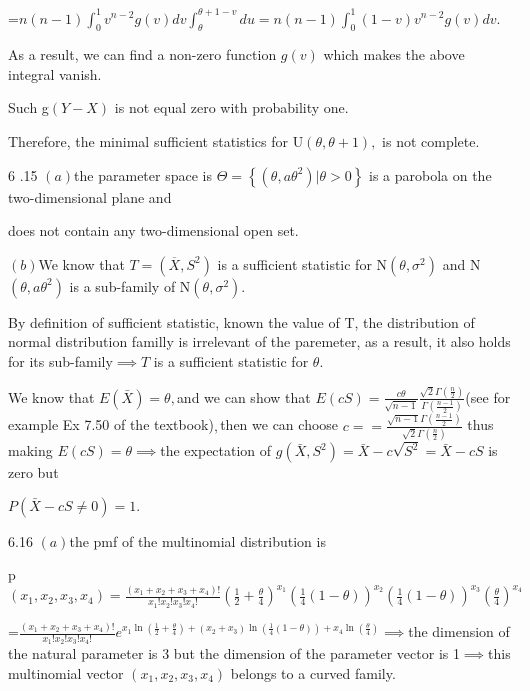 \documentclass{article}
\begin{document}
=$n\left( n-1\right) \int_{0}^{1}v^{n-2}g\left( v\right) dv\int_{\theta
}^{\theta +1-v}du=n\left( n-1\right) \int_{0}^{1}\left( 1-v\right)
v^{n-2}g\left( v\right) dv.$

As a result, we can find a non-zero function $g\left( v\right) $ which makes
the above integral vanish.

Such g$\left( Y-X\right) $ is not equal zero with probability one.

Therefore, the minimal sufficient statistics for U$\left( \theta ,\theta
+1\right) ,$ is not complete.

6 .15 $\left( a\right) $the parameter space is $\Theta =\left\{ \left(
\theta ,a\theta ^{2}\right) |\theta >0\right\} $ is a parobola on the
two-dimensional plane and

does not contain any two-dimensional open set.

$\left( b\right) $We know that $T=\left( \overline{X},S^{2}\right) $ is a
sufficient statistic for N$\left( \theta ,\sigma ^{2}\right) $ and N$\left(
\theta ,a\theta ^{2}\right) $ is a sub-family of N$\left( \theta ,\sigma
^{2}\right) .$

By definition of sufficient statistic, known the value of T, the
distribution of normal distribution familly is irrelevant of the paremeter,
as a result, it also holds for its sub-family$\implies T$ is a sufficient
statistic for $\theta .$

\bigskip We know that $E\left( \bar{X}\right) =\theta ,$and we can show that 
$E\left( cS\right) =\frac{c\theta }{\sqrt{n-1}}\frac{\sqrt{2}\Gamma \left( 
\frac{n}{2}\right) }{\Gamma \left( \frac{n-1}{2}\right) }$(see for example
Ex 7.50 of the textbook)$,$then we can choose $c==\frac{\sqrt{n-1}\Gamma
\left( \frac{n-1}{2}\right) }{\sqrt{2}\Gamma \left( \frac{n}{2}\right) }$
thus making $E\left( cS\right) =\theta \implies $the expectation of $g\left( 
\bar{X},S^{2}\right) =\bar{X}-c\sqrt{S^{2}}=\bar{X}-cS$ is zero but

$P\left( \bar{X}-cS\neq 0\right) =1.$

6.16 $\left( a\right) $the pmf of the multinomial distribution is

p$\left( x_{1},x_{2},x_{3},x_{4}\right) =\frac{\left(
x_{1}+x_{2}+x_{3}+x_{4}\right) !}{x_{1}!x_{2}!x_{3}!x_{4}!}\left( \frac{1}{2}%
+\frac{\theta }{4}\right) ^{x_{1}}\left( \frac{1}{4}\left( 1-\theta \right)
\right) ^{x_{2}}\left( \frac{1}{4}\left( 1-\theta \right) \right)
^{x_{3}}\left( \frac{\theta }{4}\right) ^{x_{4}}$

=$\frac{\left( x_{1}+x_{2}+x_{3}+x_{4}\right) !}{x_{1}!x_{2}!x_{3}!x_{4}!}%
e^{x_{1}\ln \left( \frac{1}{2}+\frac{\theta }{4}\right) +\left(
x_{2}+x_{3}\right) \ln \left( \frac{1}{4}\left( 1-\theta \right) \right)
+x_{4}\ln \left( \frac{\theta }{4}\right) }\implies $the dimension of the
natural parameter is 3 but the dimension of the parameter vector is 1$%
\implies $this multinomial vector $\left( x_{1},x_{2},x_{3},x_{4}\right) $
belongs to a curved family.
\end{document}
